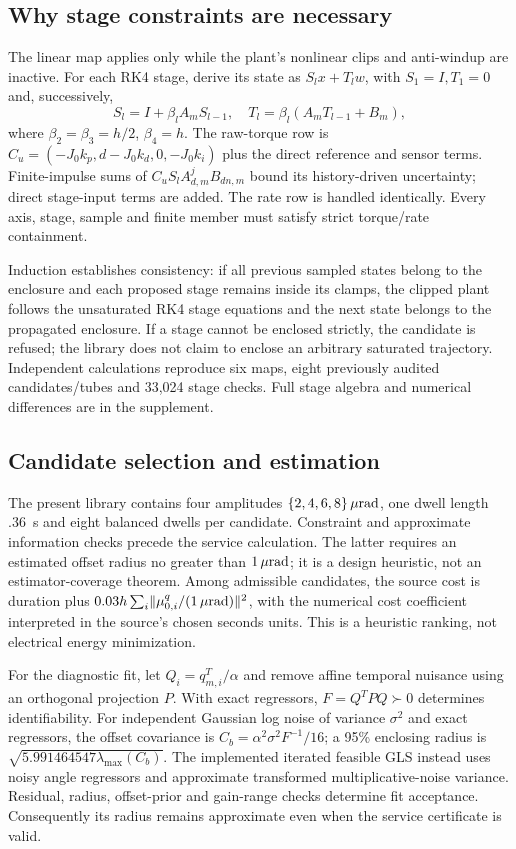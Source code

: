 \subsection{Why stage constraints are necessary}
The linear map applies only while the plant's nonlinear clips and anti-windup are inactive. For each RK4 stage, derive its state as $S_lx+T_lw$, with $S_1=I,T_1=0$ and, successively,
\begin{equation}
S_l=I+\beta_l A_m S_{l-1},\quad
T_l=\beta_l(A_mT_{l-1}+B_m),
\end{equation}
where $\beta_2=\beta_3=h/2$, $\beta_4=h$. The raw-torque row is $C_u=(-J_0k_p,d-J_0k_d,0,-J_0k_i)$ plus the direct reference and sensor terms. Finite-impulse sums of $C_uS_lA_{d,m}^jB_{dn,m}$ bound its history-driven uncertainty; direct stage-input terms are added. The rate row is handled identically. Every axis, stage, sample and finite member must satisfy strict torque/rate containment.

Induction establishes consistency: if all previous sampled states belong to the enclosure and each proposed stage remains inside its clamps, the clipped plant follows the unsaturated RK4 stage equations and the next state belongs to the propagated enclosure. If a stage cannot be enclosed strictly, the candidate is refused; the library does not claim to enclose an arbitrary saturated trajectory. Independent calculations reproduce six maps, eight previously audited candidates/tubes and 33,024 stage checks. Full stage algebra and numerical differences are in the supplement.

\subsection{Candidate selection and estimation}
The present library contains four amplitudes $\{2,4,6,8\}\,\mu\mathrm{rad}$, one dwell length .36~s and eight balanced dwells per candidate. Constraint and approximate information checks precede the service calculation. The latter requires an estimated offset radius no greater than $1\,\mu\mathrm{rad}$; it is a design heuristic, not an estimator-coverage theorem. Among admissible candidates, the source cost is duration plus $0.03h\sum_i\lVert\mu_{0,i}^{q}/(1\,\mu\mathrm{rad})\rVert^2$, with the numerical cost coefficient interpreted in the source's chosen seconds units. This is a heuristic ranking, not electrical energy minimization.

For the diagnostic fit, let $Q_i=q_{m,i}^T/\alpha$ and remove affine temporal nuisance using an orthogonal projection $P$. With exact regressors, $F=Q^TPQ\succ0$ determines identifiability. For independent Gaussian log noise of variance $\sigma^2$ and exact regressors, the offset covariance is $C_b=\alpha^2\sigma^2F^{-1}/16$; a 95\% enclosing radius is $\sqrt{5.991464547\lambda_{\max}(C_b)}$. The implemented iterated feasible GLS instead uses noisy angle regressors and approximate transformed multiplicative-noise variance. Residual, radius, offset-prior and gain-range checks determine fit acceptance. Consequently its radius remains approximate even when the service certificate is valid.

